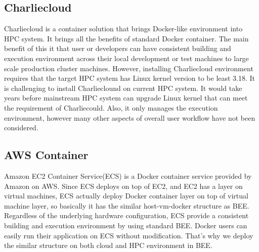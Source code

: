 \subsection{Charliecloud}
Charliecloud \cite{priedhorsky2016charliecloud} is a container solution that brings Docker-like environment into HPC system. It brings all the benefits of standard Docker container. The main benefit of this it that user or developers can have consistent building and execution environment across their local development or test machines to large scale production cluster machines. However, installing Charliecloud environment requires that the target HPC system has Linux kernel version to be least 3.18. It is challenging to install Charlieclound on current HPC system. It would take years before mainstream HPC system can upgrade Linux kernel that can meet the requirement of Charliecould. Also, it only manages the execution environment, however many other aspects of overall user workflow have not been considered.
\subsection{AWS Container}
Amazon EC2 Container Service(ECS) \cite{awscontainer} is a Docker container service provided by Amazon on AWS. Since ECS deploys on top of EC2, and EC2 has a layer on virtual machines, ECS actually deploy Docker container layer on top of virtual machine layer, so basically it has the similar host-vm-docker structure as BEE. Regardless of the underlying hardware configuration, ECS provide a consistent building and execution environment by using standard BEE. Docker users can easily run their application on ECS without modification. That's why we deploy the similar structure on both cloud and HPC environment in BEE. 
  


